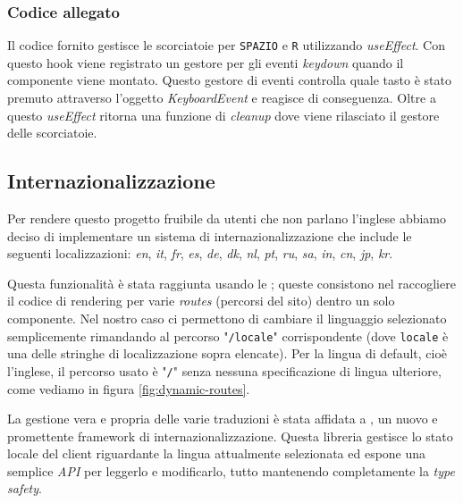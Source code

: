 \subsubsection*{Codice allegato}
\vspace{0.1em}

\vspace{0.3em}

Il codice fornito gestisce le scorciatoie per \texttt{SPAZIO} e \texttt{R} utilizzando \textit{useEffect}. Con questo hook viene registrato un gestore per gli eventi \textit{keydown} quando il componente viene montato. Questo gestore di eventi controlla quale tasto è stato premuto attraverso l'oggetto \textit{KeyboardEvent} e reagisce di conseguenza. Oltre a questo \textit{useEffect} ritorna una funzione di \textit{cleanup} dove viene rilasciato il gestore delle scorciatoie.

\newpage
\subsection{Internazionalizzazione}

Per rendere questo progetto fruibile da utenti che non parlano l'inglese abbiamo deciso di implementare un sistema di internazionalizzazione che include le seguenti localizzazioni: \textit{en}, \textit{it}, \textit{fr}, \textit{es}, \textit{de}, \textit{dk}, \textit{nl}, \textit{pt}, \textit{ru}, \textit{sa}, \textit{in}, \textit{cn}, \textit{jp}, \textit{kr}.
 
Questa funzionalità è stata raggiunta usando le ; queste consistono nel raccogliere il codice di rendering per varie \textit{routes} (percorsi del sito) dentro un solo componente.   
Nel nostro caso ci permettono di cambiare il linguaggio selezionato semplicemente rimandando al percorso "\texttt{/locale}" corrispondente (dove \texttt{locale} è una delle stringhe di localizzazione sopra elencate).
Per la lingua di default, cioè l'inglese, il percorso usato è "\texttt{/}" senza nessuna specificazione di lingua ulteriore, come vediamo in figura \ref{fig:dynamic-routes}.

La gestione vera e propria delle varie traduzioni è stata affidata a , un nuovo e promettente framework di internazionalizzazione. Questa libreria gestisce lo stato locale del client riguardante la lingua attualmente selezionata ed espone una semplice \textit{API} per leggerlo e modificarlo, tutto mantenendo completamente la \textit{type safety}.

